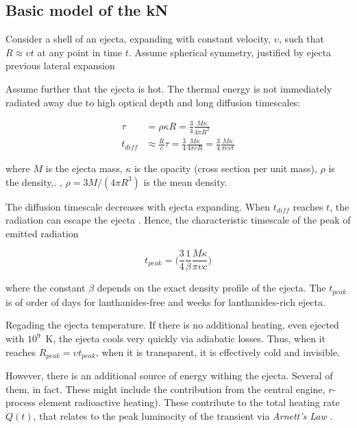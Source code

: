 \subsection{Basic model of the \ac{kN}}

Consider a shell of an ejecta, expanding with constant velocity, $\upsilon$, such that $R\approx\upsilon t$ at any point in time $t$. Assume spherical symmetry, justified by ejecta previous lateral expansion \citep{Roberts:2011,Grossman:2013lqa,Rosswog:2013kqa}

Assume further that the ejecta is hot.
The thermal energy is not immediately radiated away due to high optical depth and long diffusion timescales:

\begin{align}
\tau &= \rho \kappa R = \frac{3}{4}\frac{M\kappa}{4\pi R^2}\\ 
t_{diff} &\approx \frac{R}{c}\tau = \frac{3}{4}\frac{M\kappa}{4\pi c R} = \frac{3}{4}\frac{M\kappa}{\pi c \upsilon t}
\end{align}

where $M$ is the ejecta mass, $\kappa$ is the opacity (cross section per unit mass), $\rho$ is the density,. \eg, $\rho=3M/(4\pi R^3)$ is the mean density.

The diffusion timescale decreases with ejecta expanding. 
When $t_{diff}$ reaches $t$, the radiation can escape the ejecta \citep{Arnett:1982}. Hence, the characteristic timescale of the peak of emitted radiation 

\begin{equation}
    t_{peak} = \Big(\frac{3}{4}\frac{1}{\beta}\frac{M\kappa}{\pi \upsilon c}\Big)
\end{equation}

where the constant $\beta$ depends on the exact density profile of the ejecta. 
The $t_{peak}$ is of order of days for lanthanides-free and weeks for lanthanides-rich ejecta.

Regading the ejecta temperature. If there is no additional heating, even ejected with $10^9$~K, the ejecta cools very quickly via adiabatic losses. Thus, when it reaches $R_{peak} = \upsilon t_{peak}$, when it is transparent, it is effectively cold and invisible. 

However, there is an additional source of energy withing the ejecta. Several of them, in fact. These might include the contribution from the central engine, $r$-process element radioactive heating). These contribute to the total heating rate $\dot{Q}(t)$, that relates to the peak luminocity of the transient via \textit{Arnett's Law} \citep{Arnett:1982}.

